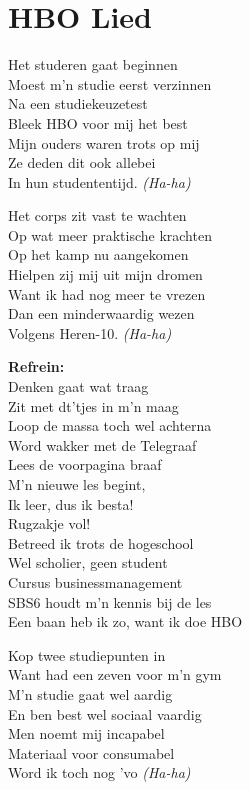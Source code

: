 \section{HBO Lied}
Het studeren gaat beginnen\\
Moest m'n studie eerst verzinnen\\
Na een studiekeuzetest\\
Bleek HBO voor mij het best\\
Mijn ouders waren trots op mij\\
Ze deden dit ook allebei\\
In hun studententijd. \textit{(Ha-ha)}

Het corps zit vast te wachten\\
Op wat meer praktische krachten\\
Op het kamp nu aangekomen\\
Hielpen zij mij uit mijn dromen\\
Want ik had nog meer te vrezen\\
Dan een minderwaardig wezen\\
Volgens Heren-10. \textit{(Ha-ha)}

\textbf{Refrein:}\\
Denken gaat wat traag\\
Zit met dt'tjes in m'n maag\\
Loop de massa toch wel achterna\\
Word wakker met de Telegraaf\\
Lees de voorpagina braaf\\
M'n nieuwe les begint,\\
Ik leer, dus ik besta!\\
Rugzakje vol!\\
Betreed ik trots de hogeschool\\
Wel scholier, geen student\\
Cursus businessmanagement\\
SBS6 houdt m'n kennis bij de les\\
Een baan heb ik zo, want ik doe HBO

Kop twee studiepunten in\\
Want had een zeven voor m'n gym\\
M'n studie gaat wel aardig\\
En ben best wel sociaal vaardig\\
Men noemt mij incapabel\\
Materiaal voor consumabel\\
Word ik toch nog 'vo \textit{(Ha-ha)}

